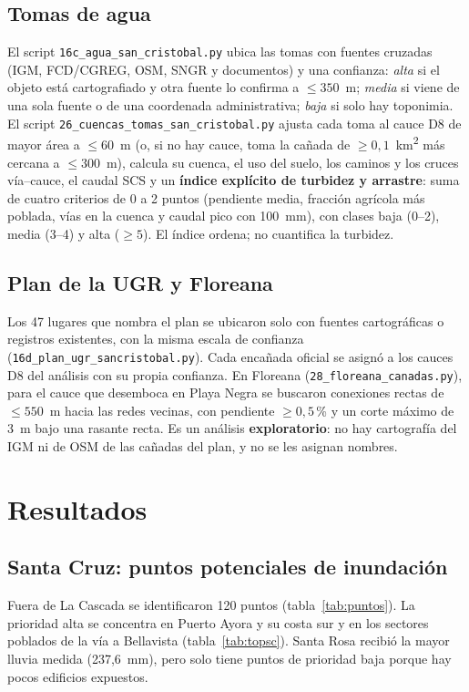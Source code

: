 \documentclass{sosg-informe}
\newcommand{\kmc}{km\textsuperscript{2}}
\begin{document}
\subsection{Tomas de agua}
El script \texttt{16c\_agua\_san\_cristobal.py} ubica las tomas con fuentes cruzadas (IGM, FCD/CGREG, OSM, SNGR y documentos) y una confianza: \emph{alta} si el objeto está cartografiado y otra fuente lo confirma a $\leq 350$~m; \emph{media} si viene de una sola fuente o de una coordenada administrativa; \emph{baja} si solo hay toponimia. El script \texttt{26\_cuencas\_tomas\_san\_cristobal.py} ajusta cada toma al cauce D8 de mayor área a $\leq 60$~m (o, si no hay cauce, toma la cañada de $\geq 0{,}1$~\kmc{} más cercana a $\leq 300$~m), calcula su cuenca, el uso del suelo, los caminos y los cruces vía--cauce, el caudal SCS y un \textbf{índice explícito de turbidez y arrastre}: suma de cuatro criterios de 0 a 2 puntos (pendiente media, fracción agrícola más poblada, vías en la cuenca y caudal pico con 100~mm), con clases baja (0--2), media (3--4) y alta ($\geq 5$). El índice ordena; no cuantifica la turbidez.

\subsection{Plan de la UGR y Floreana}
Los 47 lugares que nombra el plan se ubicaron solo con fuentes cartográficas o registros existentes, con la misma escala de confianza (\texttt{16d\_plan\_ugr\_sancristobal.py}). Cada encañada oficial se asignó a los cauces D8 del análisis con su propia confianza. En Floreana (\texttt{28\_floreana\_canadas.py}), para el cauce que desemboca en Playa Negra se buscaron conexiones rectas de $\leq 550$~m hacia las redes vecinas, con pendiente $\geq 0{,}5$\,\% y un corte máximo de 3~m bajo una rasante recta. Es un análisis \textbf{exploratorio}: no hay cartografía del IGM ni de OSM de las cañadas del plan, y no se les asignan nombres.

\section{Resultados}

\subsection{Santa Cruz: puntos potenciales de inundación}
Fuera de La Cascada se identificaron 120 puntos (tabla~\ref{tab:puntos}). La prioridad alta se concentra en Puerto Ayora y su costa sur y en los sectores poblados de la vía a Bellavista (tabla~\ref{tab:topsc}). Santa Rosa recibió la mayor lluvia medida (237,6~mm), pero solo tiene puntos de prioridad baja porque hay pocos edificios expuestos.
\end{document}
